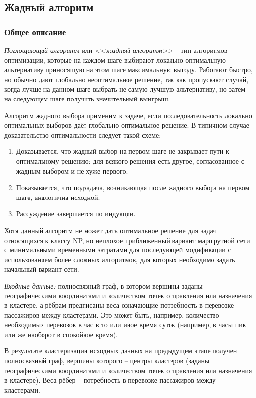 \subsection{Жадный алгоритм}\label{sec:greedy-alg}
\subsubsection{Общее описание}
\emph{Поглощающий алгоритм} или \emph{<<жадный алгоритм>>} -- тип алгоритмов оптимизации, которые на каждом 
шаге выбирают локально оптимальную альтернативу приносящую на этом шаге максимальную выгоду. Работают быстро, 
но обычно дают глобально неоптимальное решение, так как пропускают случай, когда лучше на данном шаге выбрать 
не самую лучшую альтернативу, но затем на следующем шаге получить значительный выигрыш.

Алгоритм жадного выбора применим к задаче, если последовательность локально оптимальных выборов даёт глобально 
оптимальное решение. В типичном случае доказательство оптимальности следует такой схеме:
\begin{enumerate}
    \item Доказывается, что жадный выбор на первом шаге не закрывает пути к оптимальному решению: для всякого решения 
        есть другое, согласованное с жадным выбором и не хуже первого.
    \item Показывается, что подзадача, возникающая после жадного выбора на первом шаге, аналогична исходной.
    \item Рассуждение завершается по индукции.
\end{enumerate}

Хотя данный алгоритм не может дать оптимальное решение для задач относящихся к классу NP, но неплохое 
приближенный вариант маршрутной сети с минимальными временными затратами для последующей модификации с 
использованием более сложных алгоритмов, для которых необходимо задать начальный вариант сети.

\emph{Входные данные:} полносвязный граф, в котором вершины заданы географическими координатами и количеством 
точек отправления или назначения в кластере, а рёбрам предписаны веса означающие потребность в перевозке 
пассажиров между кластерами. Это может быть, например, количество необходимых перевозок в час в то или иное 
время суток (например, в часы пик или же наоборот в спокойное время).

В результате кластеризации исходных данных на предыдущем этапе получен полносвязный граф, вершины 
которого -- центры кластеров (заданы географическими координатами и количеством точек отправления или 
назначения в кластере). Веса рёбер -- потребность в перевозке пассажиров между кластерами. 

